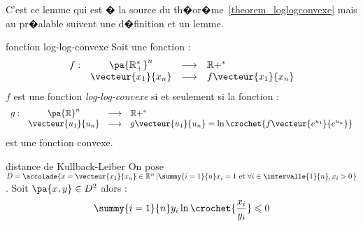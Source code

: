C'est ce lemme qui est � la source du th�or�me~\ref{theorem_loglogconvexe} mais au pr�alable suivent une d�finition et un lemme.








            \begin{xdefinition}{fonction log-log-convexe}
            \label{definition_log_log_convexe}
            Soit une fonction :
                    $$
                    \begin{array}{rccl}
                    f : & \pa{\mathbb{R}^*_+}^n &\longrightarrow& \mathbb{R}+^* \\
                    & \vecteur{x_1}{x_n} &\longrightarrow& f \vecteur{x_1}{x_n}
                    \end{array}
                    $$
            $f$ est une fonction \emph{log-log-convexe} si et seulement si la fonction :
                    $$
                    \begin{array}{rccl}
                    g : & \pa{\mathbb{R}}^n &\longrightarrow& \mathbb{R}+^* \\
                    & \vecteur{u_1}{u_n} &\longrightarrow& g\vecteur{u_1}{u_n} = \ln \crochet{ f \vecteur{e^{u_1}}{e^{u_n}}}
                    \end{array}
                    $$
            est une fonction convexe.
            \end{xdefinition}







            \begin{xlemma}{distance de Kullback-Leiber}
            \label{lemme_loglogconvexe}%
            On pose $D = \accolade{x=\vecteur{x_1}{x_n} \in \mathbb{R}^n \left| \summy{i=1}{n} x_i = 1 \text{ et } 
                            \forall i \in \intervalle{1}{n}, x_i > 0 \right.} $.\newline%
            Soit $\pa{x,y} \in D^2$ alors :
                    $$
                    \summy{i=1}{n} y_i \ln \crochet{\dfrac{x_i}{y_i}} \leqslant 0
                    $$
            \end{xlemma}


